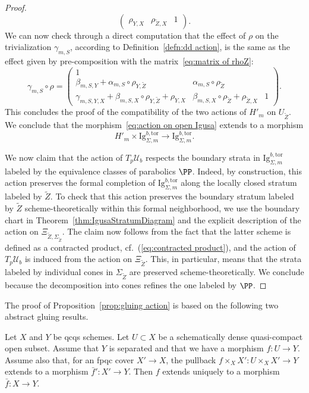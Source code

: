 \documentclass[letterpaper,11pt]{amsart}
\begin{document}
\begin{proof}
\begin{equation}
\begin{pmatrix}
        \rho_{Y,X} & \rho_{\widetilde{Z},X} & 1
    \end{pmatrix}.    
\end{equation}
We can now check through a direct computation that the effect of $\rho$ on the trivialization $\gamma_{m,S}$, according to Definition~\ref{defn:dd action}, is the same as the effect given by pre-composition 
with the matrix~\eqref{eq:matrix of rhoZ}:
\[
\gamma_{m,S}\circ \rho = 
\begin{pmatrix}
    1 & \ & \ \\
    \beta_{m,S, Y} + \alpha_{m,S}\circ \rho_{Y, \widetilde{Z}} & \alpha_{m,S}\circ \rho_{\widetilde{Z}}& \ \\
    \gamma_{m,S, Y,X} + \beta_{m,S, X}\circ \rho_{Y,\widetilde{Z}}  + \rho_{Y,X}  & \beta_{m,S,X}\circ \rho_{\widetilde{Z}} + \rho_{\widetilde{Z},X} & 1
\end{pmatrix}. 
\]
This concludes the proof of the compatibility of the two actions of $H'_m$ on $U_{\widetilde{Z}}$. We conclude that the morphism~\eqref{eq:action on open Igusa} extends to a morphism 
\[
H'_m \times \mathrm{Ig}^{b,\mathrm{tor}}_{\Sigma, m} \to  \mathrm{Ig}^{b,\mathrm{tor}}_{\Sigma, m} . 
\]


We now claim that the action of $T_p\mathcal{U}_b$ respects the boundary strata in $\mathrm{Ig}^{b,\mathrm{tor}}_{\Sigma, m}$ labeled by the equivalence classes of parabolics $\PP$. Indeed, by construction, this action preserves the formal completion of $\mathrm{Ig}^{b,\mathrm{tor}}_{\Sigma, m}$ along the locally closed stratum labeled by $\widetilde{Z}$. To check that this action preserves the boundary stratum labeled by $\widetilde{Z}$ scheme-theoretically within this formal neighborhood, we use the boundary chart in Theorem~\ref{thm:IgusaStratumDiagram} and the explicit description of the action on $\Xi_{\widetilde{Z}, \Sigma_{\widetilde{Z}}}$. The claim now follows from the fact that the latter scheme is defined as a contracted product, cf.~(\ref{eq:contracted product}), and the action of $T_p\mathcal{U}_b$ is induced from the action on $\Xi_{\widetilde{Z}}$. This, in particular, means that the strata labeled by individual cones in $\Sigma_{\widetilde{Z}}$ are preserved scheme-theoretically. We conclude because the decomposition into cones refines the one labeled by $\PP$. 
\end{proof}

The proof of Proposition~\ref{prop:gluing action} is based on the following two abstract gluing results. 

\begin{lemma}\label{lem:abstract gluing} Let $X$ and $Y$ be qcqs schemes. Let $U\subset X$ be a schematically dense quasi-compact open subset. Assume that $Y$ is separated and that we have a morphism $f: U\to Y$. Assume also that, for an fpqc cover $X'\to X$, the pullback  $f\times_{X}X': U\times_X X'\to Y$ extends to a morphism $\bar{f}':X'\to Y$. Then $f$ extends uniquely to a morphism $\bar{f}:X\to Y$. 
\end{lemma} 
\end{document}
